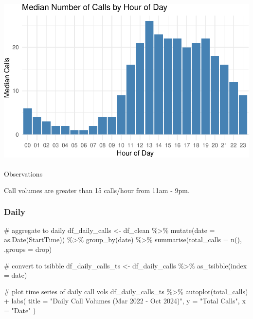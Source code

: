 \documentclass[
  letterpaper,
  DIV=11,
  numbers=noendperiod]{scrartcl}
\makeatletter
\let\oldparagraph\paragraph
\renewcommand{\paragraph}{
    \@ifstar
      \xxxParagraphStar
      \xxxParagraphNoStar
  }
\newcommand{\xxxParagraphStar}[1]{\oldparagraph*{#1}\mbox{}}
\newcommand{\xxxParagraphNoStar}[1]{\oldparagraph{#1}\mbox{}}
\newenvironment{Shaded}{\begin{snugshade}}{\end{snugshade}}
\newcommand{\AttributeTok}[1]{\textcolor[rgb]{0.40,0.45,0.13}{#1}}
\newcommand{\CommentTok}[1]{\textcolor[rgb]{0.37,0.37,0.37}{#1}}
\newcommand{\FunctionTok}[1]{\textcolor[rgb]{0.28,0.35,0.67}{#1}}
\newcommand{\NormalTok}[1]{\textcolor[rgb]{0.00,0.23,0.31}{#1}}
\newcommand{\OtherTok}[1]{\textcolor[rgb]{0.00,0.23,0.31}{#1}}
\newcommand{\SpecialCharTok}[1]{\textcolor[rgb]{0.37,0.37,0.37}{#1}}
\newcommand{\StringTok}[1]{\textcolor[rgb]{0.13,0.47,0.30}{#1}}
\makeatother
\begin{document}
\includegraphics{final_proj_group1_files/figure-pdf/hour_of_day-2.pdf}

\paragraph{Observations}\label{observations-3}

Call volumes are greater than 15 calls/hour from 11am - 9pm.

\subsubsection{Daily}\label{daily}

\begin{Shaded}
\begin{Highlighting}[]
\CommentTok{\# aggregate to daily}
\NormalTok{df\_daily\_calls }\OtherTok{\textless{}{-}}\NormalTok{ df\_clean }\SpecialCharTok{\%\textgreater{}\%}
  \FunctionTok{mutate}\NormalTok{(}\AttributeTok{date =} \FunctionTok{as.Date}\NormalTok{(StartTime)) }\SpecialCharTok{\%\textgreater{}\%}
  \FunctionTok{group\_by}\NormalTok{(date) }\SpecialCharTok{\%\textgreater{}\%}
  \FunctionTok{summarise}\NormalTok{(}\AttributeTok{total\_calls =} \FunctionTok{n}\NormalTok{(), }\AttributeTok{.groups =} \StringTok{\textquotesingle{}drop\textquotesingle{}}\NormalTok{)}

\CommentTok{\# convert to tsibble}
\NormalTok{df\_daily\_calls\_ts }\OtherTok{\textless{}{-}}\NormalTok{ df\_daily\_calls }\SpecialCharTok{\%\textgreater{}\%}
  \FunctionTok{as\_tsibble}\NormalTok{(}\AttributeTok{index =}\NormalTok{ date)}

\CommentTok{\# plot time series of daily call vols}
\NormalTok{df\_daily\_calls\_ts }\SpecialCharTok{\%\textgreater{}\%}
  \FunctionTok{autoplot}\NormalTok{(total\_calls) }\SpecialCharTok{+} 
  \FunctionTok{labs}\NormalTok{(}
    \AttributeTok{title =} \StringTok{"Daily Call Volumes (Mar 2022 {-} Oct 2024)"}\NormalTok{,}
    \AttributeTok{y =} \StringTok{"Total Calls"}\NormalTok{,}
    \AttributeTok{x =} \StringTok{"Date"}
\NormalTok{  )}
\end{Highlighting}
\end{Shaded}
\end{document}
